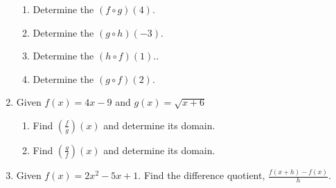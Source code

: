 \begin{enumerate}
\begin{enumerate}
\item Determine the $(f\circ g)(4)$.\vfill
\item Determine the $(g\circ h)(-3)$.\vfill
\item Determine the $(h\circ f)(1)$..\vfill
\item Determine the $(g\circ f)(2)$.\vfill
\end{enumerate}


\newpage

\item Given $f(x)=4x-9$ and $g(x)=\sqrt{x+6}$
\begin{enumerate}
\item Find $\displaystyle\left(\frac{f}{g}\right)(x)$ and determine its domain.
\vfill
\item Find $\displaystyle\left(\frac{g}{f}\right)(x)$ and determine its domain.
\vfill
\end{enumerate}

\item Given $f(x)=2x^2-5x+1$.  Find the difference quotient, $\displaystyle \frac{f(x+h)-f(x)}{h}$.
\vfill
\vfill



\end{enumerate}




